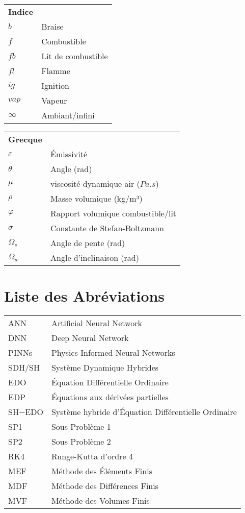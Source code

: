 \documentclass[12pt, oneside]{report} %
\theoremstyle{definition}
\theoremstyle{remark}
\begin{document}
	\vspace{1em}
	\begin{tabular}{@{}ll@{}}
		\textbf{Indice} \\
		$b$ & Braise \\
		$f$ & Combustible \\
		$fb$ & Lit de combustible \\
		$fl$ & Flamme \\
		$ig$ & Ignition \\ 
		$vap$ & Vapeur \\
		$\infty$ & Ambiant/infini \\
	\end{tabular}
	\hfill
	\begin{tabular}{@{}ll@{}}
		\textbf{Grecque} \\
		$\varepsilon$ & Émissivité \\
		$\theta$ & Angle (rad) \\
		$\mu$ & viscosité dynamique air ($Pa.s$)\\
		$\rho$ & Masse volumique (kg/m³) \\
		$\varphi$ & Rapport volumique combustible/lit \\
		$\sigma$ & Constante de Stefan-Boltzmann \\
		$\varOmega_{s}$ & Angle de pente (rad) \\
		$\varOmega_{w}$ & Angle d'inclinaison (rad) \\
	\end{tabular}	
	
	\chapter*{Liste des  Abréviations}
	\begin{tabular}{@{}ll@{}}
		ANN &Artificial Neural Network  \\
		DNN & Deep Neural Network \\ 
		PINNs & Physics-Informed Neural Networks \\
		SDH/SH & Système Dynamique Hybrides \\ 
		EDO & Équation Différentielle Ordinaire \\
		EDP & Équations aux dérivées partielles \\
		SH$- $EDO & Système hybride d'Équation Différentielle Ordinaire \\
		SP1 &   Sous Problème 1 \\
		SP2 &   Sous Problème 2 \\
		RK4 & Runge-Kutta d'ordre 4 \\
		MEF & Méthode des Éléments Finis \\
		MDF & Méthode des Différences Finis \\
		MVF & Méthode des Volumes Finis \\		
		
	\end{tabular}
	\listoffigures
	\listoftables
	
\end{document}
